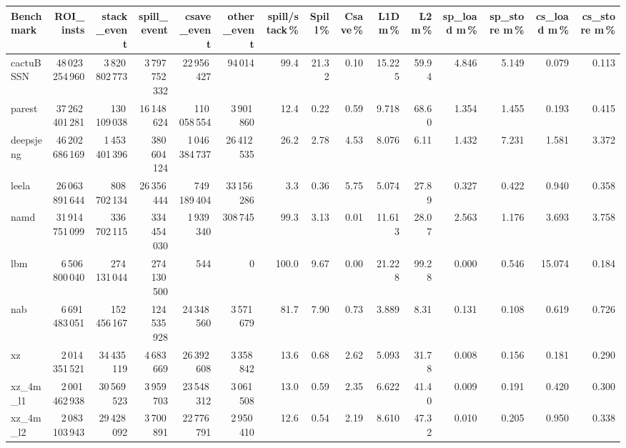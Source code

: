 \documentclass[9pt,landscape,a4paper]{article}
\begin{document}
\vspace{2mm}
\centering
\begin{adjustbox}{max width=\textwidth, max totalheight=0.50\textheight}%
\begin{tabular}{lrrrrrrrrrrrrrr}
\toprule
Benchmark & ROI\_insts & stack\_event & \textbf{spill\_event} & csave\_event & other\_event & spill/stack\,\% & Spill\,\% & Csave\,\% & L1D m\,\% & L2 m\,\% & sp\_load m\,\% & sp\_store m\,\% & cs\_load m\,\% & cs\_store m\,\% \\
\midrule
cactuBSSN & 48\,023\,254\,960 & 3\,820\,802\,773 & 3\,797\,752\,332 & 22\,956\,427 & 94\,014 & 99.4 & 21.32 & 0.10 & 15.225 & 59.94 & 4.846 & 5.149 & 0.079 & 0.113 \\
parest & 37\,262\,401\,281 & 130\,109\,038 & 16\,148\,624 & 110\,058\,554 & 3\,901\,860 & 12.4 & 0.22 & 0.59 & 9.718 & 68.60 & 1.354 & 1.455 & 0.193 & 0.415 \\
deepsjeng & 46\,202\,686\,169 & 1\,453\,401\,396 & 380\,604\,124 & 1\,046\,384\,737 & 26\,412\,535 & 26.2 & 2.78 & 4.53 & 8.076 & 6.11 & 1.432 & 7.231 & 1.581 & 3.372 \\
leela & 26\,063\,891\,644 & 808\,702\,134 & 26\,356\,444 & 749\,189\,404 & 33\,156\,286 & 3.3 & 0.36 & 5.75 & 5.074 & 27.89 & 0.327 & 0.422 & 0.940 & 0.358 \\
namd & 31\,914\,751\,099 & 336\,702\,115 & 334\,454\,030 & 1\,939\,340 & 308\,745 & 99.3 & 3.13 & 0.01 & 11.613 & 28.07 & 2.563 & 1.176 & 3.693 & 3.758 \\
lbm & 6\,506\,800\,040 & 274\,131\,044 & 274\,130\,500 & 544 & 0 & 100.0 & 9.67 & 0.00 & 21.228 & 99.28 & 0.000 & 0.546 & 15.074 & 0.184 \\
nab & 6\,691\,483\,051 & 152\,456\,167 & 124\,535\,928 & 24\,348\,560 & 3\,571\,679 & 81.7 & 7.90 & 0.73 & 3.889 & 8.31 & 0.131 & 0.108 & 0.619 & 0.726 \\
xz & 2\,014\,351\,521 & 34\,435\,119 & 4\,683\,669 & 26\,392\,608 & 3\,358\,842 & 13.6 & 0.68 & 2.62 & 5.093 & 31.78 & 0.008 & 0.156 & 0.181 & 0.290 \\
xz\_4m\_l1 & 2\,001\,462\,938 & 30\,569\,523 & 3\,959\,703 & 23\,548\,312 & 3\,061\,508 & 13.0 & 0.59 & 2.35 & 6.622 & 41.40 & 0.009 & 0.191 & 0.420 & 0.300 \\
xz\_4m\_l2 & 2\,083\,103\,943 & 29\,428\,092 & 3\,700\,891 & 22\,776\,791 & 2\,950\,410 & 12.6 & 0.54 & 2.19 & 8.610 & 47.32 & 0.010 & 0.205 & 0.950 & 0.338 \\

\end{tabular}
\end{adjustbox}
\end{document}
